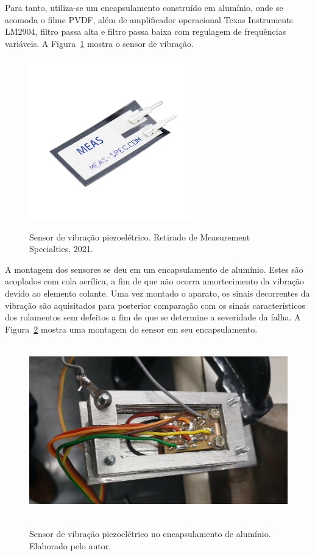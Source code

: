 \documentclass[
	12pt,				
	oneside,			
	a4paper,			
	english,			
	brazil,			
	]{abntex2ppgsi}
\begin{document}
Para tanto, utiliza-se um encapsulamento construído em alumínio, onde se acomoda o filme PVDF, além de amplificador operacional Texas Instruments LM2904, filtro passa alta e filtro passa baixa com regulagem de frequências variáveis. A Figura~\ref{Figura21} mostra o sensor de vibração. 

\begin{figure}[H]
\centering
\caption {Sensor de vibração piezoelétrico. Retirado de Measurement Specialties, 2021.}
\includegraphics[width=\textwidth,height=70mm,keepaspectratio]{Figura21}
\label{Figura21}
\end{figure} 

A montagem dos sensores se deu em um encapsulamento de alumínio. Estes são acoplados com cola acrílica, a fim de que não ocorra amortecimento da vibração devido ao elemento colante. Uma vez montado o aparato, os sinais decorrentes da vibração são aquisitados para posterior comparação com os sinais característicos dos rolamentos sem defeitos a fim de que se determine a severidade da falha. A Figura~\ref{encapsulamento_sensor} mostra uma montagem do sensor em seu encapsulamento.

\begin{figure}[H]
\centering
\caption {Sensor de vibração piezoelétrico no encapsulamento de alumínio. Elaborado pelo autor.}
\includegraphics[width=\textwidth,height=75mm,keepaspectratio]{encapsulamento_sensor}
\label{encapsulamento_sensor}
\end{figure} 
\end{document}
